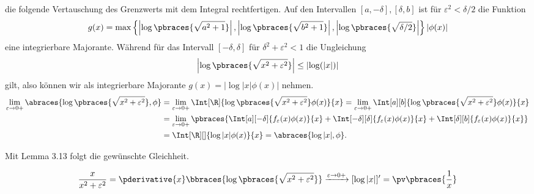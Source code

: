 \begin{solution}
die folgende Vertauschung des Grenzwerts mit dem Integral rechtfertigen.
Auf den Intervallen $[a,-\delta], [\delta, b]$ ist für $\varepsilon^2 < \delta/2$
die Funktion
\begin{align*}
  g(x) = \max\left\{\left|\log\pbraces{\sqrt{a^2 + 1}}\right|, \left|\log\pbraces{\sqrt{b^2 + 1}}\right|, \left|\log\pbraces{\sqrt{\delta/2}}\right|\right\}|\phi(x)|
\end{align*} eine
integrierbare Majorante.
Während für das Intervall $[-\delta,\delta]$ für $ \delta^2 + \varepsilon^2 < 1$ die Ungleichung
\begin{align*}
  \left|\log\pbraces{\sqrt{x^2 + \varepsilon^2}}\right| \leq \left|\log(|x|)\right|
\end{align*}
gilt, also können wir als integrierbare Majorante $g(x) = |\log{|x|}\phi(x)|$ nehmen.
\begin{align*}
    \lim_{\varepsilon \to 0+}
    \abraces{\log \pbraces{\sqrt{x^2 + \varepsilon^2}}, \phi}
    & =
    \lim_{\varepsilon \to 0+}
    \Int[\R]{\log\pbraces{\sqrt{x^2 + \varepsilon^2}} \phi(x)}{x}
    =
    \lim_{\varepsilon \to 0+}
    \Int[a][b]{\log\pbraces{\sqrt{x^2 + \varepsilon^2}} \phi(x)}{x} \\
    & =
    \lim_{\varepsilon \to 0+}
    \pbraces
    {
        \Int[a][-\delta]{f_\varepsilon(x)\phi(x)}{x}
        +
        \Int[-\delta][\delta]{f_\varepsilon(x)\phi(x)}{x}
        +
        \Int[\delta][b]{f_\varepsilon(x) \phi(x)}{x}
    } \\
    & =
    \Int[\R][]{\log|x| \phi(x)}{x}
    =
    \abraces{\log|x|, \phi}.
\end{align*}

Mit Lemma 3.13 folgt die gewünschte Gleichheit.

\begin{align*}
    \frac{x}{x^2 + \varepsilon^2}
    =
    \pderivative{x}
    \bbraces
    {
        \log
        \pbraces
        {
            \sqrt{x^2 + \varepsilon^2}
        }
    }
    \xrightarrow{\varepsilon \to 0+}
    [\log{|x|}]^\prime
    =
    \pv \pbraces{\frac{1}{x}}
\end{align*}

\end{solution}

